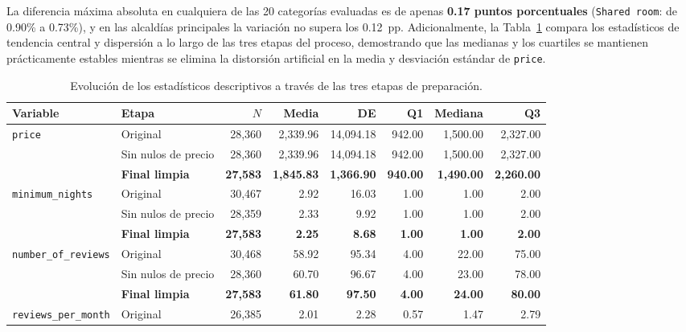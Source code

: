 \documentclass[12pt,letterpaper,oneside]{report}
\begin{document}
La diferencia máxima absoluta en cualquiera de las 20 categorías evaluadas es de apenas \textbf{0.17 puntos porcentuales} (\texttt{Shared room}: de 0.90\% a 0.73\%), y en las alcaldías principales la variación no supera los 0.12~pp. Adicionalmente, la Tabla~\ref{tab:comparativa_tres_etapas} compara los estadísticos de tendencia central y dispersión a lo largo de las tres etapas del proceso, demostrando que las medianas y los cuartiles se mantienen prácticamente estables mientras se elimina la distorsión artificial en la media y desviación estándar de \texttt{price}.

\begin{table}[htbp]
\centering
\caption{Evolución de los estadísticos descriptivos a través de las tres etapas de preparación.}
\label{tab:comparativa_tres_etapas}
\scriptsize
\renewcommand{\arraystretch}{1.13}
\begin{tabular}{l l r r r r r r}
\toprule
\rowcolor{TableHeader}
\textbf{Variable} & \textbf{Etapa} & \textbf{$N$} & \textbf{Media} & \textbf{DE} & \textbf{Q1} & \textbf{Mediana} & \textbf{Q3} \\
\midrule
\multirow{3}{*}{\texttt{price}}
  & Original            & 28,360 & 2,339.96 & 14,094.18 & 942.00 & 1,500.00 & 2,327.00 \\
  & Sin nulos de precio & 28,360 & 2,339.96 & 14,094.18 & 942.00 & 1,500.00 & 2,327.00 \\
  & \textbf{Final limpia} & \textbf{27,583} & \textbf{1,845.83} & \textbf{1,366.90} & \textbf{940.00} & \textbf{1,490.00} & \textbf{2,260.00} \\
\midrule
\multirow{3}{*}{\texttt{minimum\_nights}}
  & Original            & 30,467 & 2.92 & 16.03 & 1.00 & 1.00 & 2.00 \\
  & Sin nulos de precio & 28,359 & 2.33 &  9.92 & 1.00 & 1.00 & 2.00 \\
  & \textbf{Final limpia} & \textbf{27,583} & \textbf{2.25} & \textbf{8.68} & \textbf{1.00} & \textbf{1.00} & \textbf{2.00} \\
\midrule
\multirow{3}{*}{\texttt{number\_of\_reviews}}
  & Original            & 30,468 & 58.92 & 95.34 & 4.00 & 22.00 & 75.00 \\
  & Sin nulos de precio & 28,360 & 60.70 & 96.67 & 4.00 & 23.00 & 78.00 \\
  & \textbf{Final limpia} & \textbf{27,583} & \textbf{61.80} & \textbf{97.50} & \textbf{4.00} & \textbf{24.00} & \textbf{80.00} \\
\midrule
\multirow{3}{*}{\texttt{reviews\_per\_month}}
  & Original            & 26,385 & 2.01 & 2.28 & 0.57 & 1.47 & 2.79 \\

\end{tabular}
\end{table}
\end{document}
